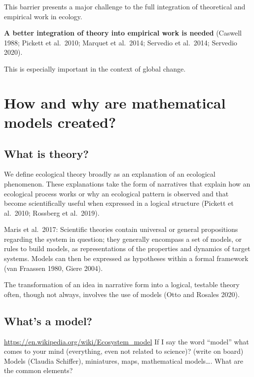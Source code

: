 \documentclass[
]{book}
\theoremstyle{definition}
\theoremstyle{definition}
\theoremstyle{definition}
\theoremstyle{definition}
\theoremstyle{remark}
\begin{document}
This barrier presents a major challenge to the full integration of theoretical and empirical work in ecology.

\textbf{A better integration of theory into empirical work is needed} (Caswell 1988; Pickett et al.~2010; Marquet et al.~2014; Servedio et al.~2014; Servedio 2020).

This is especially important in the context of global change.

\section{How and why are mathematical models created?}\label{how-and-why-are-mathematical-models-created}

\subsection{What is theory?}\label{what-is-theory}

We define ecological theory broadly as an explanation of an ecological phenomenon. These explanations take the form of narratives that explain how an ecological process works or why an ecological pattern is observed and that become scientifically useful when expressed in a logical structure (Pickett et al.~2010; Rossberg et al.~2019).

Maris et al.~2017: Scientific theories contain universal or general propositions regarding the system in question; they generally encompass a set of models, or rules to build models, as representations of the properties and dynamics of target systems. Models can then be expressed as hypotheses within a formal framework (van Fraassen 1980, Giere 2004).

The transformation of an idea in narrative form into a logical, testable theory often, though not always, involves the use of models (Otto and Rosales 2020).

\subsection{What's a model?}\label{whats-a-model}

\url{https://en.wikipedia.org/wiki/Ecosystem_model}
If I say the word ``model'' what comes to your mind (everything, even not related to science)? (write on board) Models (Claudia Schiffer), miniatures, maps, mathematical models\ldots. What are the common elements?
\end{document}
